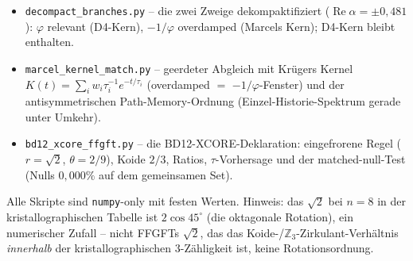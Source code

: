 \begin{itemize}
\item \texttt{decompact\_branches.py} -- die zwei Zweige dekompaktifiziert ($\operatorname{Re}\alpha=\pm0{,}481$): $\varphi$ relevant (D4-Kern), $-1/\varphi$ overdamped (Marcels Kern); D4-Kern bleibt enthalten.
\item \texttt{marcel\_kernel\_match.py} -- geerdeter Abgleich mit Kr\"ugers Kernel $K(t)=\sum_i w_i\tau_i^{-1}e^{-t/\tau_i}$ (overdamped $=$ $-1/\varphi$-Fenster) und der antisymmetrischen Path-Memory-Ordnung (Einzel-Historie-Spektrum gerade unter Umkehr).
  \item \texttt{bd12\_xcore\_ffgft.py} -- die BD12-XCORE-Deklaration: eingefrorene Regel ($r=\sqrt2$, $\theta=2/9$), Koide $2/3$, Ratios, $\tau$-Vorhersage und der matched-null-Test (Nulls $0{,}000\%$ auf dem gemeinsamen Set).
\end{itemize}
Alle Skripte sind \texttt{numpy}-only mit festen Werten. Hinweis: das $\sqrt2$ bei $n=8$ in
der kristallographischen Tabelle ist $2\cos45^\circ$ (die oktagonale Rotation), ein
numerischer Zufall -- nicht FFGFTs $\sqrt2$, das das Koide-/$\mathbb{Z}_3$-Zirkulant-Verhältnis
\emph{innerhalb} der kristallographischen $3$-Zähligkeit ist, keine Rotationsordnung.
